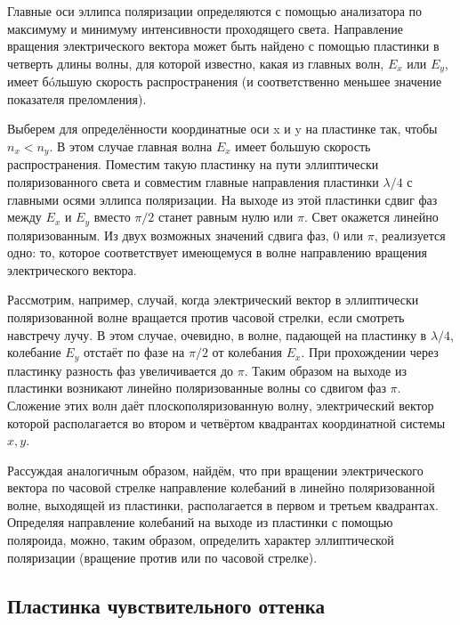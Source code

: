 \documentclass[a4paper, 12pt]{article}
\begin{document}
Главные оси эллипса поляризации определяются с помощью анализатора по максимуму и минимуму интенсивности проходящего света.
Направление вращения электрического вектора может быть найдено
с помощью пластинки в четверть длины волны, для которой известно,
какая из главных волн, $ E_x $ или $ E_y $, имеет б\'{o}льшую скорость распространения (и соответственно меньшее значение показателя преломления).

Выберем для определённости координатные оси x и y на пластинке
так, чтобы $ n_x < n_y $. В этом случае главная волна $ E_x $ имеет большую
скорость распространения. Поместим такую пластинку на пути эллиптически поляризованного света и совместим главные направления пластинки $ \lambda/4 $ с главными осями эллипса поляризации. На выходе из этой
пластинки сдвиг фаз между $ E_x $ и $ E_y $ вместо $ \pi/2 $ станет равным нулю или $ \pi $. Свет окажется линейно поляризованным. Из двух возможных значений сдвига фаз, 0 или $ \pi $, реализуется одно: то, которое соответствует имеющемуся в волне направлению вращения электрического вектора.

Рассмотрим, например, случай, когда электрический вектор в эллиптически поляризованной волне вращается против часовой стрелки,
если смотреть навстречу лучу. В этом случае, очевидно, в волне, падающей на пластинку в $ \lambda/4 $, колебание $ E_y $ отстаёт по фазе на $ \pi/2 $ от
колебания $ E_x $. При прохождении через пластинку разность фаз увеличивается до $ \pi $. Таким образом на выходе из пластинки возникают линейно поляризованные волны со сдвигом фаз $ \pi $. Сложение этих волн
даёт плоскополяризованную волну, электрический вектор которой располагается во втором и четвёртом квадрантах координатной системы
$ x, y $.

Рассуждая аналогичным образом, найдём, что при вращении электрического вектора по часовой стрелке направление колебаний в линейно поляризованной волне, выходящей из пластинки, располагается в первом и третьем квадрантах. Определяя направление колебаний на выходе из пластинки с помощью поляроида, можно, таким образом, определить характер эллиптической поляризации (вращение против или по часовой стрелке).

\subsection{Пластинка чувствительного оттенка}
\end{document}
